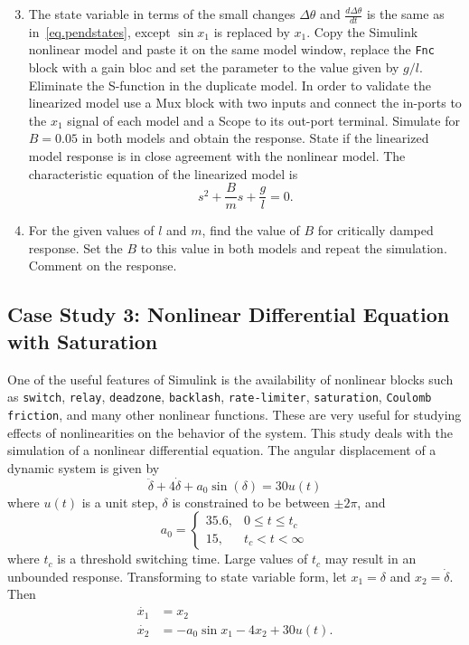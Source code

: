 \begin{enumerate}
\setcounter{enumi}{2}
\item
    The state variable in terms of the small changes $\Delta\theta$ and $\frac{d\Delta\theta}{dt}$ is the same as in~\eqref{eq.pendstates}, except $\sin x_1$ is replaced by $x_1$.  Copy the Simulink nonlinear model and paste it on the same model window, replace the \texttt{Fnc} block with a gain bloc and set the parameter to the value given by $g/l$. Eliminate the S-function in the duplicate model.  In order to validate the linearized model use a Mux block with two inputs and connect the in-ports to the $x_1$ signal of each model and a Scope to its out-port terminal.  Simulate for $B=0.05$ in both models and obtain the response.  State if the linearized model response is in close agreement with the nonlinear model.  The characteristic equation of the linearized model is
    \begin{equation}
        s^2 + \frac{B}{m}s + \frac{g}{l} = 0.
    \end{equation}
\item
    For the given values of $l$ and $m$, find the value of $B$ for critically damped response.  Set the $B$ to this value in both models and repeat the simulation.  Comment on the response.
\end{enumerate}

\subsection{Case Study 3: Nonlinear Differential Equation with Saturation}
\label{cs.saturation}
One of the useful features of Simulink is the availability of nonlinear blocks such as \texttt{switch}, \texttt{relay}, \texttt{deadzone}, \texttt{backlash}, \texttt{rate-limiter}, \texttt{saturation}, \texttt{Coulomb friction}, and many other nonlinear functions.  These are very useful for studying effects of nonlinearities on the behavior of the system.  This study deals with the simulation of a nonlinear differential equation.  The angular displacement of a dynamic system is given by
\begin{equation}    \label{eq.deltasat}
    \ddot{\delta} + 4\dot{\delta} + a_0\sin(\delta) = 30u(t)
\end{equation}
where $u(t)$ is a unit step, $\delta$ is constrained to be between $\pm 2\pi$, and
\begin{equation}    \label{eq.aswitch}
    a_0 = \begin{cases}35.6, & 0\leq t\leq t_c \\ 15, & t_c < t < \infty \end{cases}
\end{equation}
where $t_c$ is a threshold switching time.  Large values of $t_c$ may result in an unbounded response.  Transforming to state variable form, let $x_1 = \delta$ and $x_2 = \dot{\delta}$.  Then
\begin{subequations}
    \begin{flalign}
        \dot{x_1} &= x_2\\
        \dot{x_2} &= -a_0\sin x_1 -4x_2 + 30u(t).
    \end{flalign}
\end{subequations}


